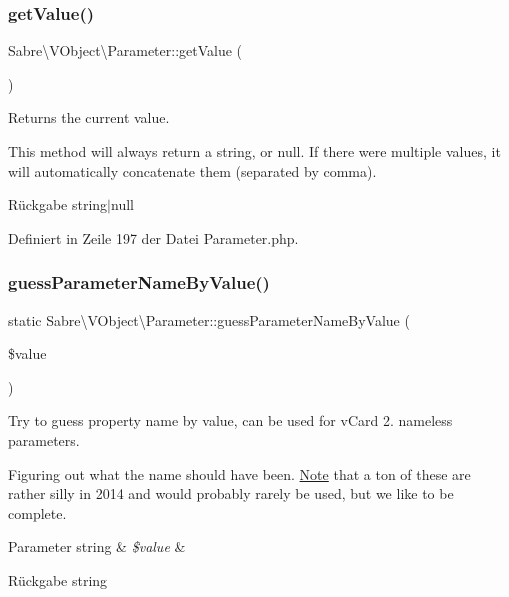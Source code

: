 \subsubsection{\texorpdfstring{get\+Value()}{getValue()}}
{\footnotesize\ttfamily Sabre\textbackslash{}\+V\+Object\textbackslash{}\+Parameter\+::get\+Value (\begin{DoxyParamCaption}{ }\end{DoxyParamCaption})}

Returns the current value.

This method will always return a string, or null. If there were multiple values, it will automatically concatenate them (separated by comma).

\begin{DoxyReturn}{Rückgabe}
string$\vert$null 
\end{DoxyReturn}


Definiert in Zeile 197 der Datei Parameter.\+php.

\mbox{\label{class_sabre_1_1_v_object_1_1_parameter_a02ccbbe5c92412e36825af7c8670e1b4}} 
\subsubsection{\texorpdfstring{guess\+Parameter\+Name\+By\+Value()}{guessParameterNameByValue()}}
{\footnotesize\ttfamily static Sabre\textbackslash{}\+V\+Object\textbackslash{}\+Parameter\+::guess\+Parameter\+Name\+By\+Value (\begin{DoxyParamCaption}\item[{}]{\$value }\end{DoxyParamCaption})\hspace{0.3cm}{\ttfamily [static]}}

Try to guess property name by value, can be used for v\+Card 2. nameless parameters.

Figuring out what the name should have been. \mbox{\hyperlink{class_note}{Note}} that a ton of these are rather silly in 2014 and would probably rarely be used, but we like to be complete.


\begin{DoxyParams}[1]{Parameter}
string & {\em \$value} & \\
\hline
\end{DoxyParams}
\begin{DoxyReturn}{Rückgabe}
string 
\end{DoxyReturn}


